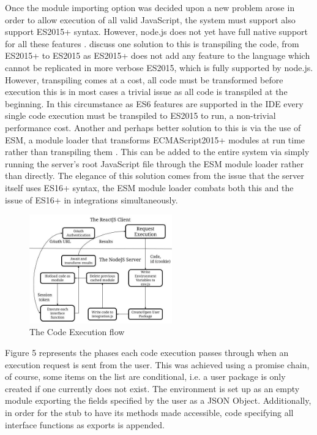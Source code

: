\documentclass[jou,apacite]{apa6}
\begin{document}
			Once the module importing option was decided upon a new problem arose in order to allow execution of all valid JavaScript, the system must support also support ES2015+ syntax. However, node.js does not yet have full native support for all these features \cite{node.js_2019}. \cite{Silva2017}  discuss one solution to this is transpiling the code, from ES2015+ to ES2015 as ES2015+ does not add any feature to the language which cannot be replicated in more verbose ES2015, which is fully supported by node.js. However, transpiling comes at a cost, all code must be transformed before execution this is in most cases a trivial issue as all code is transpiled at the beginning. In this circumstance as ES6 features are supported in the IDE every single code execution must be transpiled to ES2015 to run, a non-trivial performance cost. Another and perhaps better solution to this is via the use of ESM, a module loader that transforms ECMAScript2015+ modules at run time rather than transpiling them \cite{powers_2018}. This can be added to the entire system via simply running the server's root JavaScript file through the ESM module loader rather than directly. The elegance of this solution comes from the issue that the server itself uses ES16+ syntax,  the ESM module loader combats both this and the issue of ES16+ in integrations simultaneously.
			
				\begin{figure}[h]
\caption{The Code Execution flow}
\centering
\includegraphics[width=0.55\textwidth]{codeexecution}
\end{figure}
			
			Figure 5 represents the phases each code execution passes through when an execution request is sent from the user. This was achieved using a promise chain, of course, some items on the list are conditional, i.e. a user package is only created if one currently does not exist. The environment is set up as an empty module exporting the fields specified by the user as a JSON Object. Additionally, in order for the stub to have its methods made accessible,  code specifying all interface functions as exports is appended.
\end{document}

